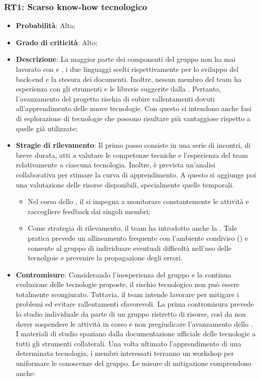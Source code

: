 \subsubsection{RT1: Scarso know-how tecnologico}
\begin{itemize}
    \item \textbf{Probabilità}: Alta;
    \item \textbf{Grado di criticità}: Alto;
    \item \textbf{Descrizione}: La maggior parte dei componenti del gruppo non ha mai lavorato con  e , i due linguaggi scelti rispettivamente per lo sviluppo del back-end e la stesura dei documenti. Inoltre, nessun membro del team ha esperienza con gli strumenti e le librerie suggerite dalla . Pertanto, l'avanzamento del progetto rischia di subire rallentamenti dovuti all'apprendimento delle nuove tecnologie. Con questo si intendono anche fasi di esplorazione di tecnologie che possono risultare più vantaggiose rispetto a quelle già utilizzate;
    \item \textbf{Stragie di rilevamento}: Il primo passo consiste in una serie di incontri, di breve durata, atti a valutare le competenze tecniche e l'esperienza del team relativamente a ciascuna tecnologia. Inoltre, è prevista un'analisi collaborativa per stimare la curva di apprendimento. A questo si aggiunge poi una valutazione delle risorse disponibili, specialmente quelle temporali.
    \begin{itemize}
        \item Nel corso dello , il \Responsabile{} si impegna a monitorare constantemente le attività e raccogliere feedback dai singoli membri;
        \item Come strategia di rilevamento, il team ha introdotto anche la . Tale pratica prevede un allineamento frequente con l'ambiente condiviso () e consente al gruppo di individuare eventuali difficoltà nell'uso delle tecnolgoie e prevenire la propagazione degli errori. 
    \end{itemize}
    \item \textbf{Contromisure}: Considerando l'inesperienza del gruppo e la continua evoluzione delle tecnologie proposte, il rischio tecnologico non può essere totalmente scongiurato. Tuttavia, il team intende lavorare per mitigare i problemi ed evitare rallentamenti sfavorevoli. La prima contromisura prevede lo studio individuale da parte di un gruppo ristretto di risorse, così da non dover sospendere le attività in corso e non pregiudicare l'avanzamento dello . I materiali di studio spaziano dalla documentazione ufficiale delle tecnologie a tutti gli strumenti collaterali. Una volta ultimato l'apprendimento di una determinata tecnologia, i membri interessati terranno un workshop per uniformare le conoscenze del gruppo. Le misure di mitigazione comprendono anche:

\end{itemize}
